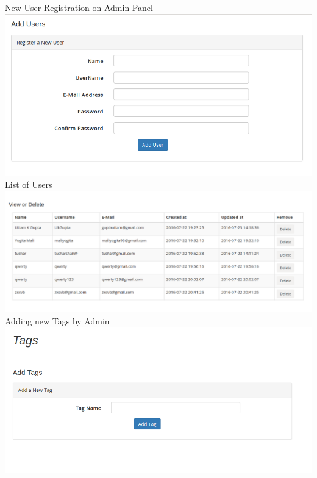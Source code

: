 \documentclass[a4paper,12pt,oneside]{book}
\begin{document}
\vspace{0.7in}

New User Registration on Admin Panel \\
\includegraphics[scale=0.45]{user.png}	\\

\vspace{0.7in}
List of Users \\
\includegraphics[scale=0.35]{user2.png}	\\

\vspace{1in}
Adding new Tags by Admin\\
\includegraphics[scale=0.45]{tags.png}	\\
\end{document}
